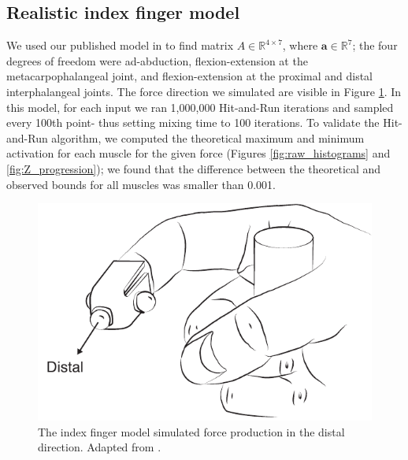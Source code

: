 \subsection*{Realistic index finger model}
\label{ss:finger}
We used our published model in \cite{Valero-Cuevas1998Large} to find matrix $A \in \mathbb{R}^{4 \times 7}$, where $\textbf{a} \in \mathbb{R}^7$; the four degrees of freedom were ad-abduction, flexion-extension at the metacarpophalangeal joint, and flexion-extension at the proximal and distal interphalangeal joints.
The force direction we simulated are visible in Figure \ref{fig:finger}.
In this model, for each input we ran 1,000,000 Hit-and-Run iterations and sampled every 100th point- thus setting mixing time to 100 iterations.
To validate the Hit-and-Run algorithm, we computed the theoretical maximum and minimum activation for each muscle for the given force (Figures \ref{fig:raw_histograms} and \ref{fig:Z_progression}); we found that the difference between the theoretical and observed bounds for all muscles was smaller than 0.001.

\begin{figure}[ht]
  \centering
  \includegraphics[]{sections/figs/finger.pdf}
  \caption{The index finger model simulated force production in the distal direction. Adapted from \cite{Valero-Cuevas1998Large}.}
  \label{fig:finger}
\end{figure}

